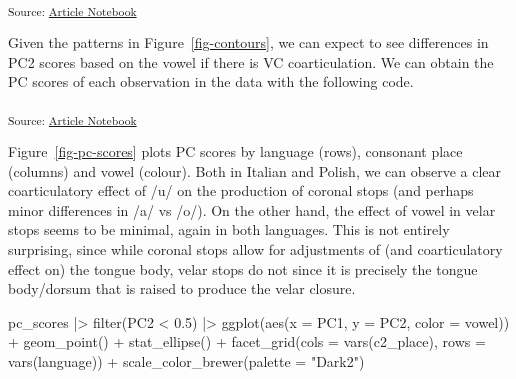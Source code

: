 \documentclass[
]{interact}
\newenvironment{Shaded}{\begin{snugshade}}{\end{snugshade}}
\newcommand{\AttributeTok}[1]{\textcolor[rgb]{0.40,0.45,0.13}{#1}}
\newcommand{\DecValTok}[1]{\textcolor[rgb]{0.68,0.00,0.00}{#1}}
\newcommand{\FloatTok}[1]{\textcolor[rgb]{0.68,0.00,0.00}{#1}}
\newcommand{\FunctionTok}[1]{\textcolor[rgb]{0.28,0.35,0.67}{#1}}
\newcommand{\NormalTok}[1]{\textcolor[rgb]{0.00,0.23,0.31}{#1}}
\newcommand{\OtherTok}[1]{\textcolor[rgb]{0.00,0.23,0.31}{#1}}
\newcommand{\SpecialCharTok}[1]{\textcolor[rgb]{0.37,0.37,0.37}{#1}}
\newcommand{\StringTok}[1]{\textcolor[rgb]{0.13,0.47,0.30}{#1}}
\begin{document}
\textsubscript{Source:
\href{https://stefanocoretta.github.io/mv_uti/index.qmd.html}{Article
Notebook}}

Given the patterns in Figure~\ref{fig-contours}, we can expect to see
differences in PC2 scores based on the vowel if there is VC
coarticulation. We can obtain the PC scores of each observation in the
data with the following code.

\begin{Shaded}
\end{Shaded}

\textsubscript{Source:
\href{https://stefanocoretta.github.io/mv_uti/index.qmd.html}{Article
Notebook}}

Figure~\ref{fig-pc-scores} plots PC scores by language (rows), consonant
place (columns) and vowel (colour). Both in Italian and Polish, we can
observe a clear coarticulatory effect of /u/ on the production of
coronal stops (and perhaps minor differences in /a/ vs /o/). On the
other hand, the effect of vowel in velar stops seems to be minimal,
again in both languages. This is not entirely surprising, since while
coronal stops allow for adjustments of (and coarticulatory effect on)
the tongue body, velar stops do not since it is precisely the tongue
body/dorsum that is raised to produce the velar closure.

\label{cell-fig-pc-scores}
\begin{Shaded}
\begin{Highlighting}[]
\NormalTok{pc\_scores }\SpecialCharTok{|\textgreater{}} 
  \FunctionTok{filter}\NormalTok{(PC2 }\SpecialCharTok{\textless{}} \FloatTok{0.5}\NormalTok{) }\SpecialCharTok{|\textgreater{}}
  \FunctionTok{ggplot}\NormalTok{(}\FunctionTok{aes}\NormalTok{(}\AttributeTok{x =}\NormalTok{ PC1, }\AttributeTok{y =}\NormalTok{ PC2, }\AttributeTok{color =}\NormalTok{ vowel)) }\SpecialCharTok{+}
  \FunctionTok{geom\_point}\NormalTok{() }\SpecialCharTok{+}
  \FunctionTok{stat\_ellipse}\NormalTok{() }\SpecialCharTok{+}
  \FunctionTok{facet\_grid}\NormalTok{(}\AttributeTok{cols =} \FunctionTok{vars}\NormalTok{(c2\_place), }\AttributeTok{rows =} \FunctionTok{vars}\NormalTok{(language)) }\SpecialCharTok{+}
  \FunctionTok{scale\_color\_brewer}\NormalTok{(}\AttributeTok{palette =} \StringTok{"Dark2"}\NormalTok{)}
\end{Highlighting}
\end{Shaded}
\end{document}
